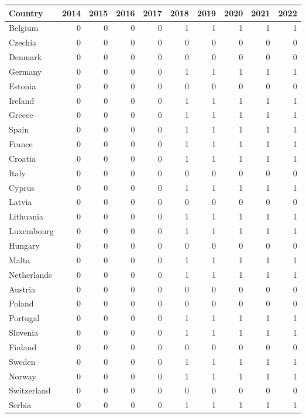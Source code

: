 \begin{tabular}{lrrrrrrrrr}
\toprule
Country & 2014 & 2015 & 2016 & 2017 & 2018 & 2019 & 2020 & 2021 & 2022 \\
\midrule
Belgium & 0 & 0 & 0 & 0 & 1 & 1 & 1 & 1 & 1 \\
Czechia & 0 & 0 & 0 & 0 & 0 & 0 & 0 & 0 & 0 \\
Denmark & 0 & 0 & 0 & 0 & 0 & 0 & 0 & 0 & 0 \\
Germany & 0 & 0 & 0 & 0 & 1 & 1 & 1 & 1 & 1 \\
Estonia & 0 & 0 & 0 & 0 & 0 & 0 & 0 & 0 & 0 \\
Ireland & 0 & 0 & 0 & 0 & 1 & 1 & 1 & 1 & 1 \\
Greece & 0 & 0 & 0 & 0 & 1 & 1 & 1 & 1 & 1 \\
Spain & 0 & 0 & 0 & 0 & 1 & 1 & 1 & 1 & 1 \\
France & 0 & 0 & 0 & 0 & 1 & 1 & 1 & 1 & 1 \\
Croatia & 0 & 0 & 0 & 0 & 1 & 1 & 1 & 1 & 1 \\
Italy & 0 & 0 & 0 & 0 & 0 & 0 & 0 & 0 & 0 \\
Cyprus & 0 & 0 & 0 & 0 & 1 & 1 & 1 & 1 & 1 \\
Latvia & 0 & 0 & 0 & 0 & 0 & 0 & 0 & 0 & 0 \\
Lithuania & 0 & 0 & 0 & 0 & 1 & 1 & 1 & 1 & 1 \\
Luxembourg & 0 & 0 & 0 & 0 & 1 & 1 & 1 & 1 & 1 \\
Hungary & 0 & 0 & 0 & 0 & 0 & 0 & 0 & 0 & 0 \\
Malta & 0 & 0 & 0 & 0 & 1 & 1 & 1 & 1 & 1 \\
Netherlands & 0 & 0 & 0 & 0 & 1 & 1 & 1 & 1 & 1 \\
Austria & 0 & 0 & 0 & 0 & 0 & 0 & 0 & 0 & 0 \\
Poland & 0 & 0 & 0 & 0 & 0 & 0 & 0 & 0 & 0 \\
Portugal & 0 & 0 & 0 & 0 & 1 & 1 & 1 & 1 & 1 \\
Slovenia & 0 & 0 & 0 & 0 & 1 & 1 & 1 & 1 & 1 \\
Finland & 0 & 0 & 0 & 0 & 0 & 0 & 0 & 0 & 0 \\
Sweden & 0 & 0 & 0 & 0 & 1 & 1 & 1 & 1 & 1 \\
Norway & 0 & 0 & 0 & 0 & 1 & 1 & 1 & 1 & 1 \\
Switzerland & 0 & 0 & 0 & 0 & 0 & 0 & 0 & 0 & 0 \\
Serbia & 0 & 0 & 0 & 0 & 1 & 1 & 1 & 1 & 1 \\
\bottomrule
\end{tabular}
